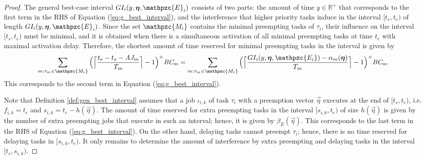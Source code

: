 \begin{proof}
	The general best-case interval $GI_i(y, \vec{\eta},\mathpzc{E}_i)$ consists of two parts: the amount of time $y\in \mathbb{R^+}$ that corresponds to the first term in the RHS of Equation (\ref{eq:g_best_interval}), and the interference that higher priority tasks induce in the interval $ [t_s,t_e) $ of length $GI_i(y, \vec{\eta},\mathpzc{E}_i)$. Since the set $\mathpzc{M_i}$ contains the minimal preempting tasks of $\tau_i$, their influence on the interval $[t_s,t_e)$ must be minimal, and it is obtained when there is a simultaneous activation of all minimal preempting tasks at time $t_e$ with maximal activation delay. Therefore, the shortest amount of time reserved for minimal preempting tasks in the interval is given by 
	\begin{align*}
	\sum\limits_{m:\tau_m \in \mathpzc{M_i}} \Big( \Big\lceil  \dfrac{t_e-t_s-\aj_m}{T_m}\Big\rceil -1 \Big)^+  \bc_m  = 	\sum\limits_{m:\tau_m \in \mathpzc{M_i}} \Big( \Big\lceil  \dfrac{GI_i(y, \vec{\eta},  \mathpzc{E_i})-\alpha_m(\vec{\eta})}{T_m}\Big\rceil -1 \Big)^+  \bc_m.
	\end{align*}
	This corresponds to the second term in Equation (\ref{eq:g_best_interval}).
	
	
	Note that Definition \ref{def:gen_best_interval} assumes that a job $\iota_{i,k}$ of task $\tau_i$ with a preemption vector $\vec{\eta}$ executes at the end of $[t_s,t_e)$, i.e. $f_{i,k}=t_e$ and $s_{i,k} = t_e - h(\vec{\eta})$. The amount of time reserved for extra preempting tasks in the interval $[s_{i,k},t_e)$ of size $h(\vec{\eta})$ is given by the number of extra preempting jobs that execute in such an interval; hence, it is given by $\beta_E(\vec{\eta})$. This corresponds to the last term in the RHS of Equation (\ref{eq:g_best_interval}). On the other hand, delaying tasks cannot preempt $\tau_i$; hence, there is no time reserved for delaying tasks in $[s_{i,k},t_e)$. It only remains to determine the amount of interference by extra preempting and delaying tasks in the interval $[t_s,s_{i,k})$.
	

\end{proof}
